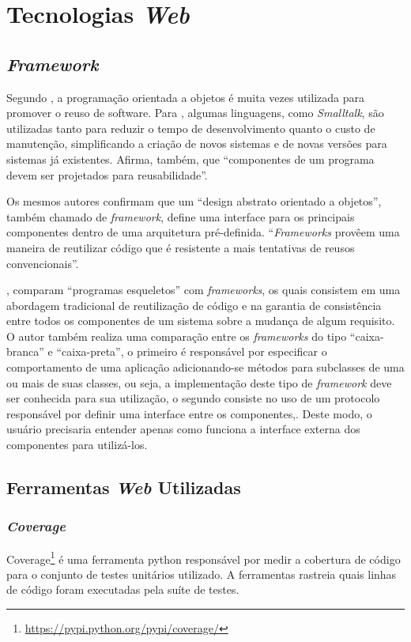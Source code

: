 \chapter{Tecnologias \textit{Web}}

\section{\textit{Framework}}
Segundo , a programação orientada a objetos é muita vezes utilizada para promover o reuso de software. Para , algumas linguagens, como \textit{Smalltalk}, são utilizadas tanto para reduzir o tempo de desenvolvimento quanto o custo de manutenção, simplificando a criação de novos sistemas e de novas versões para sistemas já existentes. Afirma, também, que ``componentes de um programa devem ser projetados para reusabilidade''.

Os mesmos autores confirmam que um ``design abstrato orientado a objetos'', também chamado de \textit{framework}, define uma interface para os principais componentes dentro de uma
arquitetura pré-definida. ``\textit{Frameworks} provêem uma maneira de reutilizar código que é resistente a mais tentativas de reusos convencionais''.

, comparam ``programas esqueletos'' com \textit{frameworks}, os quais consistem em uma abordagem tradicional de reutilização de código e na garantia de consistência entre todos os componentes de um sistema sobre a mudança de algum requisito. O autor também realiza uma comparação entre os \textit{frameworks} do tipo ``caixa-branca'' e ``caixa-preta'', o primeiro é responsável por especificar o comportamento de uma aplicação adicionando-se métodos para subclasses de uma ou mais de suas classes, ou seja, a implementação deste tipo de \textit{framework} deve ser conhecida para sua utilização, o segundo consiste no uso de um protocolo responsável por definir uma interface entre os componentes,. Deste modo, o usuário precisaria entender apenas como funciona a interface externa dos componentes para utilizá-los.

\section{Ferramentas \textit{Web} Utilizadas}
    \subsection{\textit{Coverage}}
    Coverage\footnote{\url{https://pypi.python.org/pypi/coverage/}} é uma ferramenta python responsável por medir a cobertura de código para o conjunto de testes unitários utilizado. A ferramentas rastreia quais linhas de código foram executadas pela suíte de testes.

